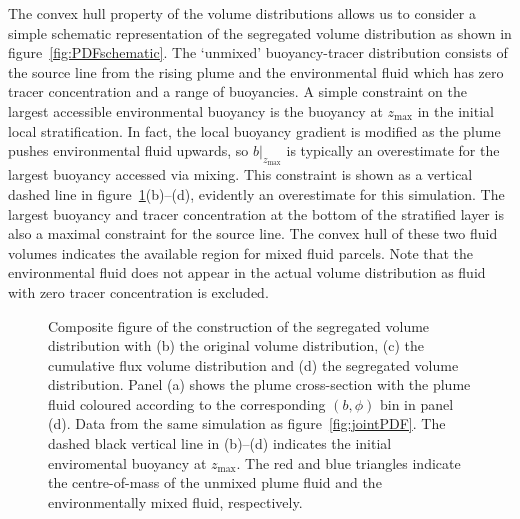 \documentclass[a4paper]{article}
\begin{document}
The convex hull property of the volume distributions allows us to consider a simple schematic representation
of the segregated volume distribution as shown in figure~\ref{fig:PDFschematic}. The `unmixed' buoyancy-tracer
distribution consists of the source line from the rising plume and the environmental fluid which has zero
tracer concentration and a range of buoyancies.  A simple constraint on the largest accessible environmental
buoyancy is the buoyancy at $z_{\max}$ in the initial local stratification. In fact, the local buoyancy
gradient is modified as the plume pushes environmental fluid upwards, so $\left.b\right|_{z_{\max}}$ is
typically an overestimate for the largest buoyancy accessed via mixing. This constraint is shown as a
vertical dashed line in figure~\ref{fig:modPDF}(b)--(d), evidently an overestimate for this simulation.
The largest buoyancy and tracer concentration at the bottom of the stratified layer is also a maximal
constraint for the source line.  The convex hull of these two fluid volumes indicates the available region
for mixed fluid parcels. Note that the environmental fluid does not appear in the actual volume
distribution as fluid with zero tracer concentration is excluded.

\begin{figure}
	\centering
	\caption{Composite figure of the construction of the segregated volume distribution with (b) the original
	volume distribution, (c) the cumulative flux volume distribution and (d) the segregated volume
	distribution. Panel (a) shows the plume cross-section with the plume fluid coloured according to the
	corresponding $(b, \phi)$ bin in panel (d).  Data from the same simulation as figure~\ref{fig:jointPDF}.
	The dashed black vertical line in (b)--(d) indicates the initial enviromental buoyancy at $z_{\max}$. The
	red and blue triangles indicate the centre-of-mass of the unmixed plume fluid and the environmentally
	mixed fluid, respectively.}
	\label{fig:modPDF}
\end{figure}
\end{document}
